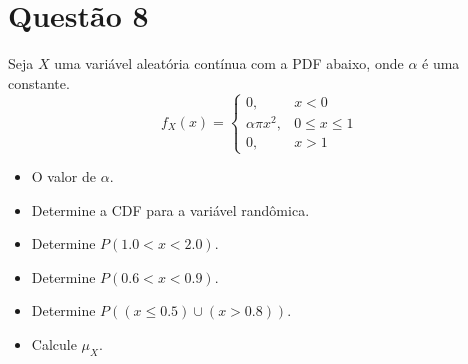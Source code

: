 \section{Questão 8}
Seja $X$ uma variável aleatória contínua com a PDF abaixo, onde $\alpha$ é uma constante.
%
\begin{equation*}
    f_X(x) = 
    \begin{cases}
        0,             & x < 0 \\
        \alpha\pi x^2, & 0 \leq x \leq 1 \\
        0,             & x > 1
    \end{cases}
\end{equation*}

\begin{itemize}
    \item [a)] O valor de $\alpha$.
    \item [b)] Determine a CDF para a variável randômica.
    \item [c)] Determine $P(1.0 < x < 2.0)$.
    \item [d)] Determine $P(0.6 < x < 0.9)$.
    \item [e)] Determine $P((x \leq 0.5) \cup (x > 0.8))$.
    \item [f)] Calcule $\mu_X$.
\end{itemize}

\respostas

